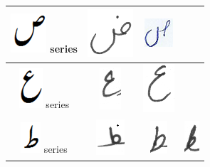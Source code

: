 \begin{table}[h]
\begin{tabular}{@{}cccc@{}}
\includegraphics[scale=0.20]{suad_orig.png} series & \includegraphics[scale=0.15]{zuwad2.PNG} & \includegraphics[scale=0.15]{Suad_4.png}  &  \\
\hline
\includegraphics[scale=0.15]{aien_orig.png} series & \includegraphics[scale=0.15]{aein.PNG} & \includegraphics[scale=0.10]{aein2.PNG}  &  \\
\hline
\includegraphics[scale=0.15]{tuay_orig.png} series & \includegraphics[scale=0.15]{tuin.PNG} & \includegraphics[scale=0.15]{tuin2.PNG}  & \includegraphics[scale=0.15]{zuin.PNG} \\

\end{tabular}
\end{table}
